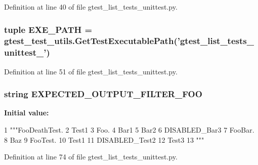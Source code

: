 \-Definition at line 40 of file gtest\-\_\-list\-\_\-tests\-\_\-unittest.\-py.

\hypertarget{namespacegtest__list__tests__unittest_a216df3f485400b109390103528720888}{
\subsubsection[{\-E\-X\-E\-\_\-\-P\-A\-T\-H}]{\setlength{\rightskip}{0pt plus 5cm}tuple {\bf \-E\-X\-E\-\_\-\-P\-A\-T\-H} = {\bf gtest\-\_\-test\-\_\-utils.\-Get\-Test\-Executable\-Path}('gtest\-\_\-list\-\_\-tests\-\_\-unittest\-\_\-')}}\label{d1/d4f/namespacegtest__list__tests__unittest_a216df3f485400b109390103528720888}


\-Definition at line 51 of file gtest\-\_\-list\-\_\-tests\-\_\-unittest.\-py.

\hypertarget{namespacegtest__list__tests__unittest_acba2fd0c011344c01b030fb60138b990}{
\subsubsection[{\-E\-X\-P\-E\-C\-T\-E\-D\-\_\-\-O\-U\-T\-P\-U\-T\-\_\-\-F\-I\-L\-T\-E\-R\-\_\-\-F\-O\-O}]{\setlength{\rightskip}{0pt plus 5cm}string {\bf \-E\-X\-P\-E\-C\-T\-E\-D\-\_\-\-O\-U\-T\-P\-U\-T\-\_\-\-F\-I\-L\-T\-E\-R\-\_\-\-F\-O\-O}}}\label{d1/d4f/namespacegtest__list__tests__unittest_acba2fd0c011344c01b030fb60138b990}
{\bfseries \-Initial value\-:}
\begin{DoxyCode}
1 """FooDeathTest.
2   Test1
3 Foo.
4   Bar1
5   Bar2
6   DISABLED_Bar3
7 FooBar.
8   Baz
9 FooTest.
10   Test1
11   DISABLED_Test2
12   Test3
13 """
\end{DoxyCode}


\-Definition at line 74 of file gtest\-\_\-list\-\_\-tests\-\_\-unittest.\-py.

